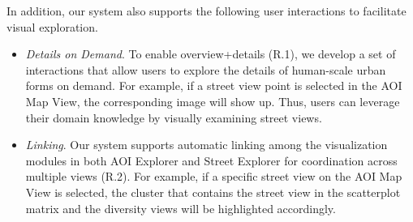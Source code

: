 In addition, our system also supports the following user interactions to facilitate visual exploration.
\begin{itemize}

\vspace*{-1mm}
\item
\textit{Details on Demand}.
To enable overview+details (R.1), we develop a set of interactions that allow users to explore the details of human-scale urban forms on demand.
For example, if a street view point is selected in the AOI Map View, the corresponding image will show up.
Thus, users can leverage their domain knowledge by visually examining street views.

\vspace*{-1mm}
\item
\textit{Linking}.
Our system supports automatic linking among the visualization modules in both AOI Explorer and Street Explorer for coordination across multiple views (R.2).
For example, if a specific street view on the AOI Map View is selected, the cluster that contains the street view in the scatterplot matrix and the diversity views will be highlighted accordingly.

\end{itemize}